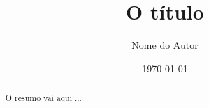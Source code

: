 \documentclass{article}
\title{O título}
\author{Nome do Autor}
\date{\today}
\begin{document}
	\maketitle
	
	\begin{abstract}
	O resumo vai aqui ...
	\end{abstract}
\end{document}
